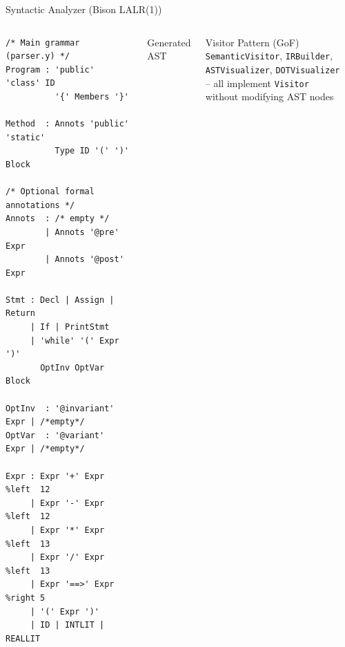 \documentclass[aspectratio=169,11pt]{beamer}
\begin{document}
\begin{frame}[fragile]{Syntactic Analyzer (Bison LALR(1))}
\begin{columns}[t]
\begin{lstlisting}[style=cppslide]
/* Main grammar (parser.y) */
Program : 'public' 'class' ID
          '{' Members '}'

Method  : Annots 'public' 'static'
          Type ID '(' ')' Block

/* Optional formal annotations */
Annots  : /* empty */
        | Annots '@pre'  Expr
        | Annots '@post' Expr

Stmt : Decl | Assign | Return
     | If | PrintStmt
     | 'while' '(' Expr ')'
       OptInv OptVar Block

OptInv  : '@invariant' Expr | /*empty*/
OptVar  : '@variant'   Expr | /*empty*/

Expr : Expr '+' Expr  %left  12
     | Expr '-' Expr  %left  12
     | Expr '*' Expr  %left  13
     | Expr '/' Expr  %left  13
     | Expr '==>' Expr %right 5
     | '(' Expr ')'
     | ID | INTLIT | REALLIT
\end{lstlisting}

  \begin{block}{Generated AST}
    \centering\small
  \end{block}
  \begin{exampleblock}{\small Visitor Pattern (GoF)}
    \texttt{SemanticVisitor}, \texttt{IRBuilder},\\
    \texttt{ASTVisualizer}, \texttt{DOTVisualizer}\\
    -- all implement \texttt{Visitor}\\
    without modifying AST nodes
  \end{exampleblock}
\end{columns}
\end{frame}
\end{document}
